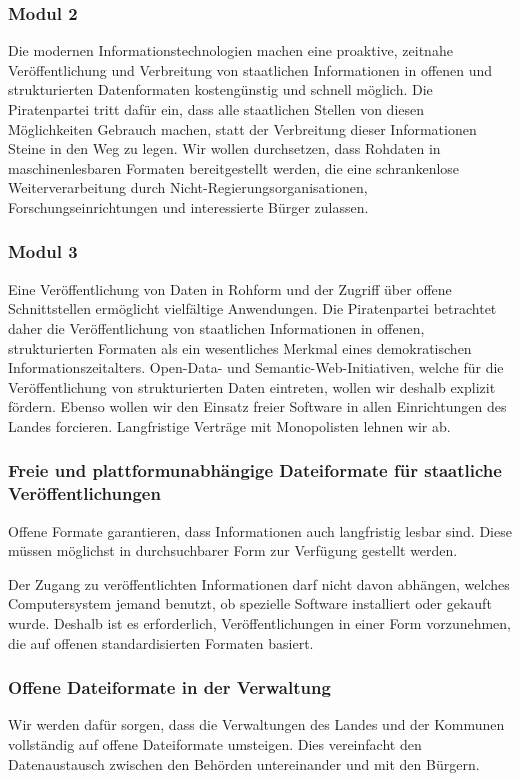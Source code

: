 \subsubsection{Modul 2}
\abstimmung
Die modernen Informationstechnologien machen eine proaktive, zeitnahe Veröffentlichung und Verbreitung von staatlichen Informationen in offenen und strukturierten Datenformaten kostengünstig und schnell möglich. Die Piratenpartei tritt dafür ein, dass alle staatlichen Stellen von diesen Möglichkeiten Gebrauch machen, statt der Verbreitung dieser Informationen Steine in den Weg zu legen. Wir wollen durchsetzen, dass Rohdaten in maschinenlesbaren Formaten bereitgestellt werden, die eine schrankenlose Weiterverarbeitung durch Nicht-Regierungsorganisationen, Forschungseinrichtungen und interessierte Bürger zulassen.

\subsubsection{Modul 3}
\abstimmung
Eine Veröffentlichung von Daten in Rohform und der Zugriff über offene Schnittstellen ermöglicht vielfältige Anwendungen. Die Piratenpartei betrachtet daher die Veröffentlichung von staatlichen Informationen in offenen, strukturierten Formaten als ein wesentliches Merkmal eines demokratischen Informationszeitalters. Open-Data- und Semantic-Web-Initiativen, welche für die Veröffentlichung von strukturierten Daten eintreten, wollen wir deshalb explizit fördern. Ebenso wollen wir den Einsatz freier Software in allen Einrichtungen des Landes forcieren. Langfristige Verträge mit Monopolisten lehnen wir ab.
 
\subsubsection{Freie und plattformunabhängige Dateiformate für staatliche Veröffentlichungen}
\abstimmung
Offene Formate garantieren, dass Informationen auch langfristig lesbar sind. Diese müssen möglichst in durchsuchbarer Form zur Verfügung gestellt werden.

Der Zugang zu veröffentlichten Informationen darf nicht davon abhängen, welches Computersystem jemand benutzt, ob spezielle Software installiert oder gekauft wurde. Deshalb ist es erforderlich, Veröffentlichungen in einer Form vorzunehmen, die auf offenen standardisierten Formaten basiert.

\subsubsection{Offene Dateiformate in der Verwaltung}
\abstimmung
Wir werden dafür sorgen, dass die Verwaltungen des Landes und der Kommunen vollständig auf offene Dateiformate umsteigen. Dies vereinfacht den Datenaustausch zwischen den Behörden untereinander und mit den Bürgern.

